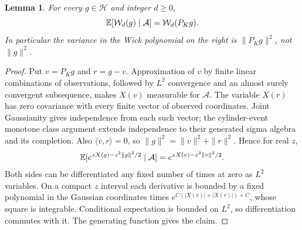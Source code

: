 \documentclass[11pt]{article}
\newtheorem{lemma}[theorem]{Lemma}
\newcommand{\Hh}{\mathcal H}\newcommand{\tr}{\operatorname{tr}}
\begin{document}
\begin{lemma}\label{lem:fullwickprediction}
For every $g\in\Hh$ and integer $d\geq0$,
\[
 \mathbb E[\mathcal W_d(g)\mid\mathcal A]=\mathcal W_d(P_Kg).
\]
In particular the variance in the Wick polynomial on the right is
$\|P_Kg\|^2$, not $\|g\|^2$.
\end{lemma}
\begin{proof}
Put $v=P_Kg$ and $r=g-v$. Approximation of $v$ by finite linear
combinations of observations, followed by $L^2$ convergence and an
almost surely convergent subsequence, makes $X(v)$ measurable for
$\mathcal A$. The variable $X(r)$ has zero covariance with every
finite vector of observed coordinates. Joint Gaussianity gives
independence from each such vector; the cylinder-event monotone
class argument extends independence to their generated sigma
algebra and its completion. Also $\langle v,r\rangle=0$, so
$\|g\|^2=\|v\|^2+\|r\|^2$. Hence for real $z$,
\[
 \mathbb E[e^{zX(g)-z^2\|g\|^2/2}\mid\mathcal A]
       =e^{zX(v)-z^2\|v\|^2/2}.
\]
Both sides can be differentiated any fixed number of times at
zero as $L^2$ variables. On a compact $z$ interval each derivative
is bounded by a fixed polynomial in the Gaussian coordinates
times $e^{C(|X(v)|+|X(r)|)+C}$, whose square is integrable.
Conditional expectation is bounded on $L^2$, so differentiation
commutes with it. The generating function gives the claim.
\end{proof}
\end{document}
